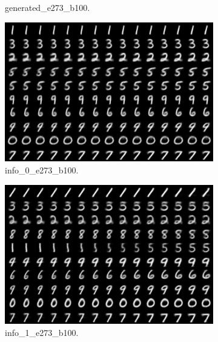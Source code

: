 \begin{figure}[!htbp]
\begin{subfigure}[t]{0.48\textwidth}
   \caption{generated_e273_b100.}
   \label{fig:.._.._notes_journal_figures_2019-04-24_compare_grad_mode-f}
\end{subfigure}
\begin{subfigure}[t]{0.48\textwidth}
   \includegraphics[width=\textwidth,center]{2019-04-24/compare_grad_mode/info_0_e273_b100.png}
   \caption{info_0_e273_b100.}
   \label{fig:.._.._notes_journal_figures_2019-04-24_compare_grad_mode-g}
\end{subfigure}
\begin{subfigure}[t]{0.48\textwidth}
   \includegraphics[width=\textwidth,center]{2019-04-24/compare_grad_mode/info_1_e273_b100.png}
   \caption{info_1_e273_b100.}
   \label{fig:.._.._notes_journal_figures_2019-04-24_compare_grad_mode-h}
\end{subfigure}
\begin{subfigure}[t]{0.48\textwidth}

\end{subfigure}
\end{figure}
